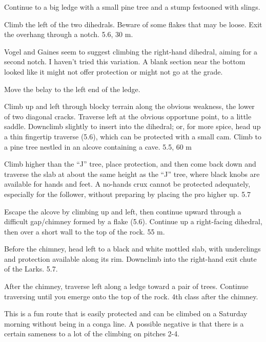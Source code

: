 \documentclass{tahquitz}
\begin{document}
 Continue to a big ledge with a small pine tree and a stump festooned with
slings.

 Climb the left of the two dihedrals. Beware of some flakes that may be loose.
Exit the overhang through a notch. 5.6, 30 m.

 Vogel and Gaines seem to suggest climbing the right-hand dihedral,
aiming for a second notch. I haven't tried this variation.
A blank section near the bottom looked like it might not
offer protection or might not go at the grade.

 Move the belay to the left end of the ledge.


 Climb up and left through blocky terrain along the obvious weakness, the
lower of two diagonal cracks. Traverse left at the obvious opportune point, to a
little saddle. Downclimb slightly to insert into the dihedral; or, for more spice,
head up a thin fingertip traverse (5.6),
which can be protected with a small cam.
Climb to a pine tree nestled in an alcove containing a cave. 5.5, 60 m

 Climb higher than the ``J'' tree, place protection, and then come
back down and traverse the slab at about the same height as the ``J'' tree, where black
knobs are available for hands and feet. A no-hands crux cannot be protected adequately,
especially for the follower, without preparing by placing the pro higher up. 5.7

 Escape the alcove by climbing up and left, then continue upward through a
difficult gap/chimney formed by a flake (5.6). Continue up a right-facing dihedral, then
over a short wall to the top
of the rock. 55 m.

 Before the chimney, head left to a black and white mottled slab, with underclings
and protection available along its rim. Downclimb into the right-hand exit chute of the Larks. 5.7.

 After the chimney, traverse left along a ledge toward a pair of trees. Continue
traversing until you emerge onto the top of the rock. 4th class after the chimney.




This is a fun route that is easily protected and
can be climbed on a Saturday morning without being in a conga line. A
possible negative is that there is a certain sameness to a lot of the
climbing on pitches 2-4.
\end{document}

